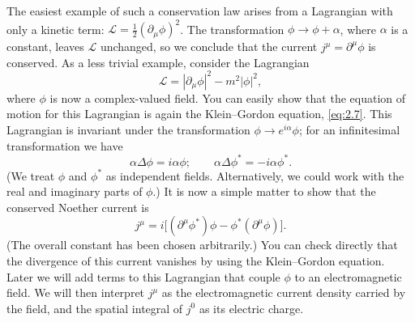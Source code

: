The easiest example of such a conservation law arises from a Lagrangian
with only a kinetic term: $\mathcal{L} =
\tfrac{1}{2}(\partial_\mu\phi)^2$.  The transformation $\phi\to\phi+\alpha$,
where $\alpha$ is a constant, leaves $\mathcal{L}$ unchanged, so we
conclude that the current $j^\mu = \partial^\mu\phi$ is conserved.  As a
less trivial example, consider the Lagrangian
\begin{equation}
  \mathcal{L} = |\partial_\mu\phi|^2 - m^2|\phi|^2,
  \label{eq:2.14}
\end{equation}
where $\phi$ is now a complex-valued field.  You can easily show that the
equation of motion for this Lagrangian is again the Klein--Gordon
equation, \eqref{eq:2.7}.  This Lagrangian is invariant under the
transformation $\phi \to e^{i\alpha}\phi$; for an infinitesimal
transformation we have
\begin{equation}
  \alpha\Delta\phi = i\alpha\phi;\qquad
  \alpha\Delta\phi^{*} = -i\alpha\phi^{*}.
  \label{eq:2.15}
\end{equation}
(We treat $\phi$ and $\phi^{*}$ as independent fields.  Alternatively, we
could work with the real and imaginary parts of $\phi$.)  It is now a
simple matter to show that the conserved Noether current is
\begin{equation}
  j^\mu = i\bigl[ (\partial^\mu\phi^{*})\phi - \phi^{*}(\partial^\mu\phi)
    \bigr].
  \label{eq:2.16}
\end{equation}
(The overall constant has been chosen arbitrarily.)  You can check
directly that the divergence of this current vanishes by using the
Klein--Gordon equation.  Later we will add terms to this Lagrangian that
couple $\phi$ to an electromagnetic field.  We will then interpret $j^\mu$
as the electromagnetic current density carried by the field, and the
spatial integral of $j^0$ as its electric charge.

